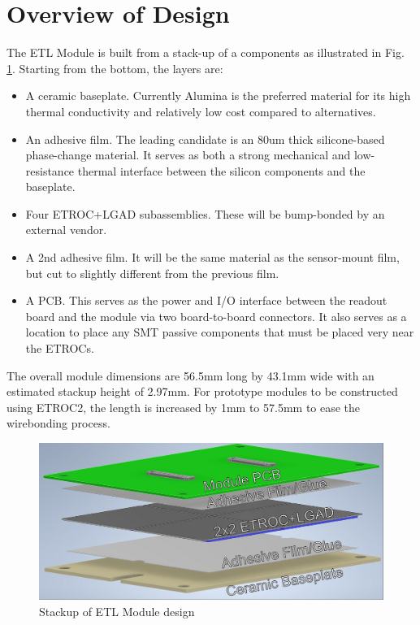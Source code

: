 \documentclass[10pt]{datasheet}
\begin{document}
\onecolumn

\section{Overview of Design}

The ETL Module is built from a stack-up of a components as illustrated in Fig. \ref{fig:overview}. Starting from the bottom, the layers are:

\begin{itemize}
	\item A ceramic baseplate. Currently Alumina is the preferred material for its high thermal conductivity and relatively low cost compared to alternatives.
	\item An adhesive film. The leading candidate is an 80um thick silicone-based phase-change material. It serves as both a strong mechanical and low-resistance thermal interface between the silicon components and the baseplate.
	\item Four ETROC+LGAD subassemblies. These will be bump-bonded by an external vendor.
	\item A 2nd adhesive film. It will be the same material as the sensor-mount film, but cut to slightly different from the previous film.
	\item A PCB. This serves as the power and I/O interface between the readout board and the module via two board-to-board connectors. It also serves as a location to place any SMT passive components that must be placed very near the ETROCs.
\end{itemize}

The overall module dimensions are 56.5mm long by 43.1mm wide with an estimated stackup height of 2.97mm. For prototype modules to be constructed using ETROC2, the length is increased by 1mm to 57.5mm to ease the wirebonding process.


\begin{figure}[h]
	\includegraphics[width=\textwidth]{figures/overview.png}
	\caption{Stackup of ETL Module design}
	\label{fig:overview}
\end{figure}
\end{document}
